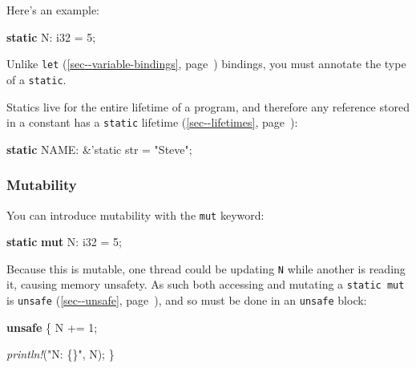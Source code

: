 \documentclass[a4paper,]{book}
\renewcommand*{\hyperref}[2][\ar]{%
  \def\ar{#2}%
  #2 (\autoref{#1}, page~\pageref{#1})}
\newenvironment{Shaded}{\begin{snugshade}}{\end{snugshade}}
\newcommand{\KeywordTok}[1]{\textcolor[rgb]{0.13,0.29,0.53}{\textbf{{#1}}}}
\newcommand{\DataTypeTok}[1]{\textcolor[rgb]{0.13,0.29,0.53}{{#1}}}
\newcommand{\DecValTok}[1]{\textcolor[rgb]{0.00,0.00,0.81}{{#1}}}
\newcommand{\StringTok}[1]{\textcolor[rgb]{0.31,0.60,0.02}{{#1}}}
\newcommand{\OtherTok}[1]{\textcolor[rgb]{0.56,0.35,0.01}{{#1}}}
\newcommand{\PreprocessorTok}[1]{\textcolor[rgb]{0.56,0.35,0.01}{\textit{{#1}}}}
\newcommand{\NormalTok}[1]{{#1}}
\begin{document}
Here's an example:

\begin{Shaded}
\begin{Highlighting}[]
\KeywordTok{static} \NormalTok{N: }\DataTypeTok{i32} \NormalTok{= }\DecValTok{5}\NormalTok{;}
\end{Highlighting}
\end{Shaded}

Unlike \hyperref[sec--variable-bindings]{\texttt{let}} bindings, you
must annotate the type of a \texttt{static}.

Statics live for the entire lifetime of a program, and therefore any
reference stored in a constant has a
\hyperref[sec--lifetimes]{\texttt{\textquotesingle{}static} lifetime}:

\begin{Shaded}
\begin{Highlighting}[]
\KeywordTok{static} \NormalTok{NAME: &}\OtherTok{'static} \DataTypeTok{str} \NormalTok{= }\StringTok{"Steve"}\NormalTok{;}
\end{Highlighting}
\end{Shaded}

\subsubsection{Mutability}\label{mutability}

You can introduce mutability with the \texttt{mut} keyword:

\begin{Shaded}
\begin{Highlighting}[]
\KeywordTok{static} \KeywordTok{mut} \NormalTok{N: }\DataTypeTok{i32} \NormalTok{= }\DecValTok{5}\NormalTok{;}
\end{Highlighting}
\end{Shaded}

Because this is mutable, one thread could be updating \texttt{N} while
another is reading it, causing memory unsafety. As such both accessing
and mutating a \texttt{static\ mut} is
\hyperref[sec--unsafe]{\texttt{unsafe}}, and so must be done in an
\texttt{unsafe} block:

\begin{Shaded}
\begin{Highlighting}[]

\KeywordTok{unsafe} \NormalTok{\{}
    \NormalTok{N += }\DecValTok{1}\NormalTok{;}

    \PreprocessorTok{println!}\NormalTok{(}\StringTok{"N: \{\}"}\NormalTok{, N);}
\NormalTok{\}}
\end{Highlighting}
\end{Shaded}
\end{document}
